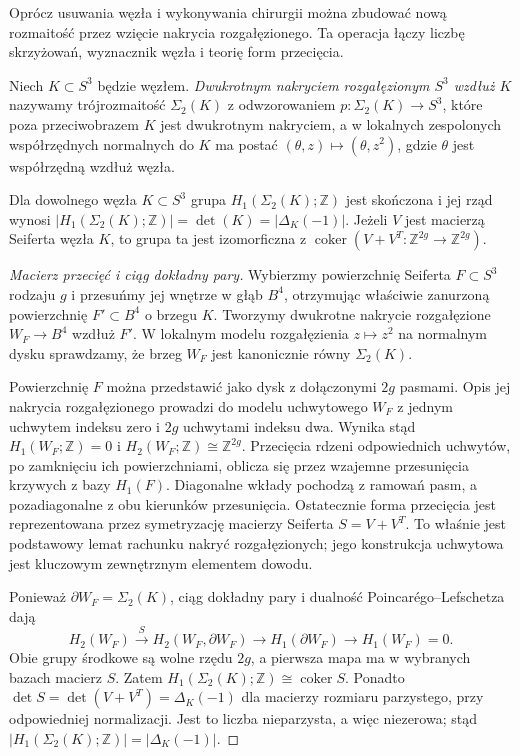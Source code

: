 Oprócz usuwania węzła i wykonywania chirurgii można
zbudować nową rozmaitość przez wzięcie nakrycia
rozgałęzionego. Ta operacja łączy liczbę skrzyżowań,
wyznacznik węzła i teorię form przecięcia.

\begin{definicja}
Niech $K\subset S^3$ będzie węzłem. \emph{Dwukrotnym
nakryciem rozgałęzionym $S^3$ wzdłuż $K$} nazywamy
trójrozmaitość $\Sigma_2(K)$ z odwzorowaniem
$p\colon\Sigma_2(K)\to S^3$, które poza przeciwobrazem
$K$ jest dwukrotnym nakryciem, a w lokalnych zespolonych
współrzędnych normalnych do $K$ ma postać
$(\theta,z)\mapsto(\theta,z^2)$,
gdzie $\theta$ jest współrzędną wzdłuż węzła.
\end{definicja}

\begin{twierdzenie}
Dla dowolnego węzła $K\subset S^3$ grupa
$H_1(\Sigma_2(K);\mathbb Z)$ jest skończona i
jej rząd wynosi
$|H_1(\Sigma_2(K);\mathbb Z)|
=\det(K)=|\Delta_K(-1)|$.
Jeżeli $V$ jest macierzą Seiferta węzła $K$,
to grupa ta jest izomorficzna z
$\operatorname{coker}(V+V^T:\mathbb Z^{2g}\to\mathbb Z^{2g})$.
\end{twierdzenie}

\begin{proof}[Macierz przecięć i ciąg dokładny pary]
Wybierzmy powierzchnię Seiferta $F\subset S^3$ rodzaju $g$
i przesuńmy jej wnętrze w głąb $B^4$, otrzymując właściwie
zanurzoną powierzchnię $F'\subset B^4$ o brzegu $K$.
Tworzymy dwukrotne nakrycie rozgałęzione
$W_F\to B^4$ wzdłuż $F'$. W lokalnym modelu rozgałęzienia
$z\mapsto z^2$ na normalnym dysku sprawdzamy, że brzeg
$W_F$ jest kanonicznie równy $\Sigma_2(K)$.

Powierzchnię $F$ można przedstawić jako dysk z dołączonymi
$2g$ pasmami. Opis jej nakrycia rozgałęzionego prowadzi do
modelu uchwytowego $W_F$ z jednym uchwytem indeksu zero
i $2g$ uchwytami indeksu dwa. Wynika stąd
$H_1(W_F;\mathbb Z)=0$ i $H_2(W_F;\mathbb Z)\cong\mathbb Z^{2g}$.
Przecięcia rdzeni odpowiednich uchwytów, po zamknięciu ich
powierzchniami, oblicza się przez wzajemne przesunięcia
krzywych z bazy $H_1(F)$. Diagonalne wkłady pochodzą z
ramowań pasm, a pozadiagonalne z obu kierunków przesunięcia.
Ostatecznie forma przecięcia jest reprezentowana przez
symetryzację macierzy Seiferta $S=V+V^T$.
To właśnie jest podstawowy lemat rachunku nakryć
rozgałęzionych; jego konstrukcja uchwytowa jest kluczowym
zewnętrznym elementem dowodu.

Ponieważ $\partial W_F=\Sigma_2(K)$, ciąg dokładny pary
i dualność Poincarégo--Lefschetza dają
\[
H_2(W_F)\xrightarrow{\;S\;}H_2(W_F,\partial W_F)
\longrightarrow H_1(\partial W_F)\longrightarrow H_1(W_F)=0.
\]
Obie grupy środkowe są wolne rzędu $2g$, a pierwsza mapa
ma w wybranych bazach macierz $S$. Zatem
$H_1(\Sigma_2(K);\mathbb Z)\cong\operatorname{coker}S$.
Ponadto $\det S=\det(V+V^T)=\Delta_K(-1)$ dla macierzy
rozmiaru parzystego, przy odpowiedniej normalizacji.
Jest to liczba nieparzysta, a więc niezerowa; stąd
$|H_1(\Sigma_2(K);\mathbb Z)|=|\Delta_K(-1)|$.
\end{proof}

